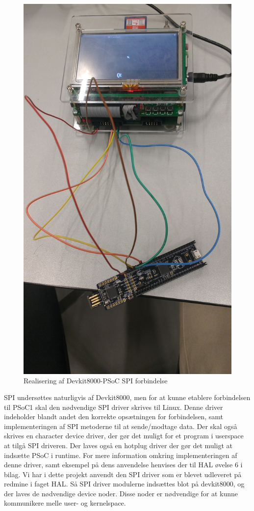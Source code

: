 \begin{figure}[H]
\includegraphics{Screenshots/Realisering_devkit_psoc}
\caption{Realisering af Devkit8000-PSoC SPI forbindelse}
\end{figure}

SPI undersøttes naturligvis af Devkit8000, men for at kunne etablere forbindelsen til PSoC1 skal den nødvendige SPI driver skrives til Linux. 
Denne driver indeholder blandt andet den korrekte opsætningen for forbindelsen, samt implementeringen af SPI metoderne til at sende/modtage data.
Der skal også skrives en character device driver, der gør det muligt for et program i userspace at tilgå SPI driveren. Der laves også en hotplug driver 
der gør det muligt at indsætte PSoC i runtime. For mere information omkring implementeringen af denne driver, samt eksempel på dens anvendelse henvises der til HAL 
øvelse 6 i bilag. 
Vi har i dette projekt anvendt den SPI driver som er blevet udleveret på redmine i faget HAL. Så SPI driver modulerne indsættes blot på devkit8000, og der 
laves de nødvendige device noder. Disse noder er nødvendige for at kunne kommunikere melle user- og kernelspace. 

